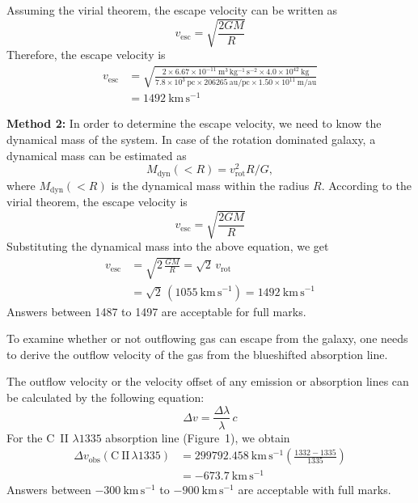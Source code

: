 \begin{description}
  Assuming the virial theorem, the escape velocity can be written as
  \begin{equation*}
  v_{\mathrm{esc}} = \sqrt{\frac{2GM}{R}}
  \tag*{[2]}
  \end{equation*}
  Therefore, the escape velocity is
  \begin{align*}
  v_{\mathrm{esc}}
  &= \sqrt{\frac{2 \times 6.67 \times 10^{-11}~\mathrm{m^{3}\,kg^{-1}\,s^{-2}}
      \times 4.0 \times 10^{42}~\mathrm{kg}}
     {7.8 \times 10^{3}~\mathrm{pc} \times 206265~\mathrm{au/pc}
      \times 1.50 \times 10^{11}~\mathrm{m/au}}} \\
  &= 1492~\mathrm{km\,s^{-1}}
  \tag*{[3]}
  \end{align*}

  \textbf{Method 2:} In order to determine the escape velocity, we need to
  know the dynamical mass of the system. In case of the rotation dominated
  galaxy, a dynamical mass can be estimated as
  \begin{equation*}
  M_{\mathrm{dyn}}(<R) = v_{\mathrm{rot}}^2 R / G,
  \tag*{[2]}
  \end{equation*}
  where $M_{\mathrm{dyn}}(<R)$ is the dynamical mass within the radius $R$.
  According to the virial theorem, the escape velocity is
  \begin{equation*}
  v_{\mathrm{esc}} = \sqrt{\frac{2GM}{R}}
  \tag*{[2]}
  \end{equation*}
  Substituting the dynamical mass into the above equation, we get
  \begin{align*}
  v_{\mathrm{esc}} &= \sqrt{2\,\frac{GM}{R}} = \sqrt{2}\,v_{\mathrm{rot}}
  \tag*{[3]} \\
  &= \sqrt{2}\,(1055~\mathrm{km\,s^{-1}}) = 1492~\mathrm{km\,s^{-1}}
  \tag*{[2]}
  \end{align*}
  Answers between 1487 to 1497 are acceptable for full marks.

\item[c)] To examine whether or not outflowing gas can escape from the
  galaxy, one needs to derive the outflow velocity of the gas from the
  blueshifted absorption line.

  The outflow velocity or the velocity offset of any emission or absorption
  lines can be calculated by the following equation:
  \begin{equation*}
  \Delta v = \frac{\Delta\lambda}{\lambda}\,c
  \tag*{[2]}
  \end{equation*}
  For the C~II $\lambda 1335$ absorption line (Figure~1), we obtain
  \begin{align*}
  \Delta v_{\mathrm{obs}}(\mathrm{C~II}\,\lambda 1335)
  &= 299792.458~\mathrm{km\,s^{-1}}
     \left(\frac{1332 - 1335}{1335}\right) \\
  &= -673.7~\mathrm{km\,s^{-1}}
  \tag*{[2]}
  \end{align*}
  Answers between $-300~\mathrm{km\,s^{-1}}$ to $-900~\mathrm{km\,s^{-1}}$
  are acceptable with full marks.


\end{description}
